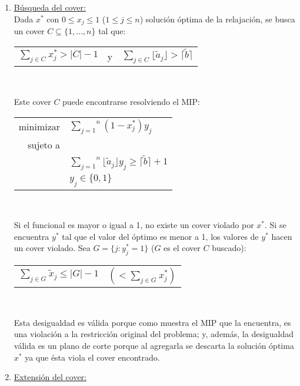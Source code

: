 \begin{enumerate}
\item \underline{Búsqueda del cover:}\\
Dada $x^*$ con $0\leq x_j \leq 1$ ($1\leq j \leq n$) solución óptima de la relajación, se busca un cover $C\subseteq \{1,...,n\}$ tal que:

{
\centering
\begin{tabular}{ccc}
$\overset{}{\underset{j \in C}{\sum}} x^*_j > |C|-1$ & y & $\overset{}{\underset{j \in C}{\sum}} \lfloor \tilde{a}_j \rfloor > \lceil \tilde{b} \rceil$\\
\end{tabular}\\
\vspace{5mm}
}

Este cover $C$ puede encontrarse resolviendo el MIP:

{
\centering
\begin{tabular}{rl}
minimizar & $\overset{n}{\underset{j=1}{\sum}} (1 - x^*_j) y_j$\\
sujeto a&\\
&$\overset{n}{\underset{j=1}{\sum}} \lfloor \tilde{a}_j \rfloor y_j \geq \lceil \tilde{b} \rceil + 1$\\
&$y_j \in \{0,1\}$\\
\end{tabular}\\
\vspace{5mm}
}

Si el funcional es mayor o igual a 1, no existe un cover violado por $x^*$. Si se encuentra $y^*$ tal que el valor del óptimo es menor a 1, los valores de $y^*$ hacen un cover violado. Sea $G=\{j: y^*_j = 1\}$ ($G$ es el cover $C$ buscado):

{
\centering
\begin{tabular}{cc}
$\overset{}{\underset{j \in G}{\sum}} \tilde{x}_j \leq |G|-1$ & $(< \overset{}{\underset{j \in G}{\sum}} x^*_j)$\\
\end{tabular}\\
\vspace{5mm}
}

Esta desigualdad es válida porque como muestra el MIP que la encuentra, es una violación a la restricción original del problema; y, además, la desigualdad válida es un plano de corte porque al agregarla se descarta la solución óptima $x^*$ ya que ésta viola el cover encontrado.

\item \underline{Extensión del cover:}


\end{enumerate}
